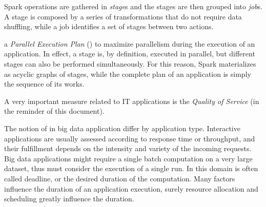 
Spark  operations are gathered in \textit{stage}s and the stages are then grouped into \textit{job}s. A stage is composed by a series of transformations that do not require data shuffling, while a job identifies a set of stages between two actions. 

a \textit{Parallel Execution Plan} (\plan) to maximize parallelism during the execution of an application. In effect, a stage is, by definition, executed in parallel, but different stages can also be performed simultaneously. For this reason, Spark materializes as acyclic graphs of stages, while the complete plan of an application is simply the sequence of its works.



A very important measure related to IT applications is the \textit{Quality of Service} (\qos in the reminder of this document).

The notion of \qos in big data application differ by application type. Interactive applications are usually assessed according to response time or throughput, and their fulfillment depends on the intensity and variety of the incoming requests. Big data applications might require a single batch computation on a very large dataset, thus \qos must consider the execution of a single run. In this domain \qos is often called deadline, or the desired duration of the computation. Many factors influence the duration of an application execution, surely resource allocation and scheduling greatly influence the duration. 

